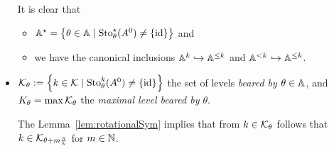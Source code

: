 \begin{notations}
\begin{itemize}
\begin{s-rem}
        It is clear that
        \begin{itemize}
          \item $\mathbb{A}^{\star}=\left\{\theta\in\mathbb{A}
            \mid\operatorname{Sto}_{\theta}^\star(A^0)\neq\{\operatorname{id}\}\right\}$ and
          \item we have the canonical inclusions
            $\mathbb{A}^k\hookrightarrow\mathbb{A}^{\leq k}$ and
            $\mathbb{A}^{<k}\hookrightarrow\mathbb{A}^{\leq k}$.
        \end{itemize}
      \end{s-rem}
    \item $\mathcal{K}_\theta:=\left\{k\in\mathcal{K}\mid\operatorname{Sto}_\theta^k(A^0)\neq\{\operatorname{id}\}\right\}$
      the set of levels \emph{beared by $\theta\in\mathbb{A}$}, and
      $K_\theta=\max\mathcal{K}_\theta$ the \emph{maximal level beared by $\theta$}.
      \begin{s-rem}
        The Lemma~\ref{lem:rotationalSym} implies that from $k\in\mathcal{K}_{\theta}$
        follows that $k\in\mathcal{K}_{\theta+m\frac{\pi}{k}}$ for $m\in\mathbb{N}$.
      \end{s-rem}
  \end{itemize}
\end{notations}

